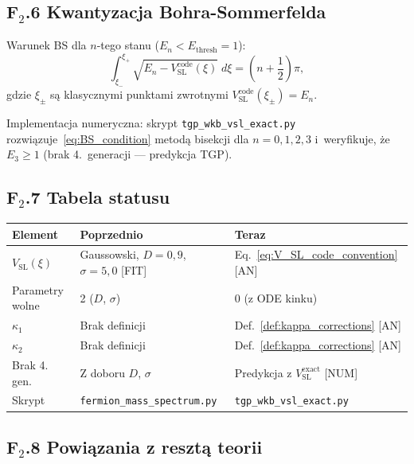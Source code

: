 \subsection*{F$_2$.6 Kwantyzacja Bohra-Sommerfelda}

Warunek BS dla $n$-tego stanu ($E_n < E_\mathrm{thresh} = 1$):
\begin{equation}
  \int_{\xi_-}^{\xi_+}
    \sqrt{E_n - V_\mathrm{SL}^\mathrm{code}(\xi)}\;d\xi
  = \left(n + \frac{1}{2}\right)\pi,
  \label{eq:BS_condition}
\end{equation}
gdzie $\xi_\pm$ są klasycznymi punktami zwrotnymi
$V_\mathrm{SL}^\mathrm{code}(\xi_\pm) = E_n$.

Implementacja numeryczna: skrypt \texttt{tgp\_wkb\_vsl\_exact.py}
rozwiązuje~\eqref{eq:BS_condition} metodą bisekcji
dla $n = 0, 1, 2, 3$ i~weryfikuje, że $E_3 \geq 1$
(brak 4.~generacji --- predykcja TGP).

\subsection*{F$_2$.7 Tabela statusu}

\begin{center}
\begin{tabular}{lll}
\toprule
Element & Poprzednio & Teraz \\
\midrule
$V_\mathrm{SL}(\xi)$ & Gaussowski, $D{=}0{,}9$, $\sigma{=}5{,}0$ [FIT] & Eq.~\eqref{eq:V_SL_code_convention} [AN] \\
Parametry wolne & 2 ($D$, $\sigma$) & 0 (z ODE kinku) \\
$\kappa_1$ & Brak definicji & Def.~\ref{def:kappa_corrections} [AN] \\
$\kappa_2$ & Brak definicji & Def.~\ref{def:kappa_corrections} [AN] \\
Brak 4. gen. & Z doboru $D$, $\sigma$ & Predykcja z $V_\mathrm{SL}^\mathrm{exact}$ [NUM] \\
Skrypt & \texttt{fermion\_mass\_spectrum.py} & \texttt{tgp\_wkb\_vsl\_exact.py} \\
\bottomrule
\end{tabular}
\end{center}

\subsection*{F$_2$.8 Powiązania z resztą teorii}

